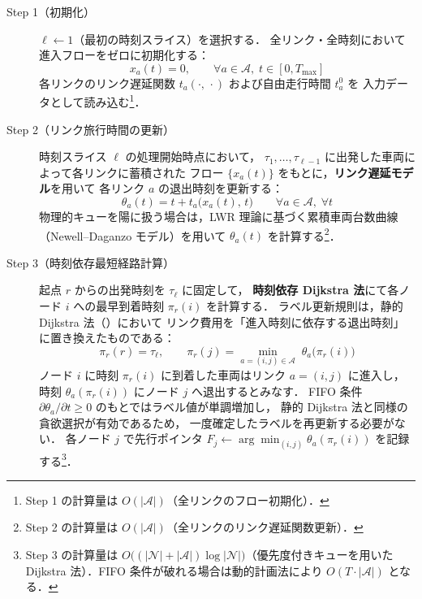 \begin{description}
  \item[\textsf{Step 1}（初期化）]
    $\ell \leftarrow 1$（最初の時刻スライス）を選択する．
    全リンク・全時刻において進入フローをゼロに初期化する：
    \[
      x_a(t) = 0, \qquad \forall a \in \mathcal{A},\; t \in [0, T_{\max}]
    \]
    各リンクのリンク遅延関数 $t_a(\cdot,\,\cdot)$ および自由走行時間 $t_a^0$ を
    入力データとして読み込む\footnote{Step 1 の計算量は $O(|\mathcal{A}|)$（全リンクのフロー初期化）．}．

  \item[\textsf{Step 2}（リンク旅行時間の更新）]
    時刻スライス $\ell$ の処理開始時点において，
    $\tau_1, \ldots, \tau_{\ell-1}$ に出発した車両によって各リンクに蓄積された
    フロー $\{x_a(t)\}$ をもとに，\textbf{リンク遅延モデル}を用いて
    各リンク $a$ の退出時刻を更新する：
    \begin{equation}
      \theta_a(t) = t + t_a\bigl(x_a(t),\, t\bigr) \qquad \forall a \in \mathcal{A},\; \forall t
      \label{eq:link-delay-update}
    \end{equation}
    物理的キューを陽に扱う場合は，LWR 理論に基づく累積車両台数曲線
    （Newell--Daganzo モデル）を用いて $\theta_a(t)$ を計算する\footnote{Step 2 の計算量は $O(|\mathcal{A}|)$（全リンクのリンク遅延関数更新）．}．

  \item[\textsf{Step 3}（時刻依存最短経路計算）]
    起点 $r$ からの出発時刻を $\tau_\ell$ に固定して，
    \textbf{時刻依存 Dijkstra 法}にて各ノード $i$ への最早到着時刻 $\pi_r(i)$ を計算する．
    ラベル更新規則は，静的 Dijkstra 法（）において
    リンク費用を「進入時刻に依存する退出時刻」に置き換えたものである：
    \begin{equation}
      \pi_r(r) = \tau_\ell, \qquad
      \pi_r(j) = \min_{a=(i,j) \in \mathcal{A}}\; \theta_a\!\bigl(\pi_r(i)\bigr)
      \label{eq:time-dep-dijkstra}
    \end{equation}
    ノード $i$ に時刻 $\pi_r(i)$ に到着した車両はリンク $a=(i,j)$ に進入し，
    時刻 $\theta_a(\pi_r(i))$ にノード $j$ へ退出するとみなす．
    FIFO 条件 $\partial\theta_a/\partial t \geq 0$ のもとではラベル値が単調増加し，
    静的 Dijkstra 法と同様の貪欲選択が有効であるため，
    一度確定したラベルを再更新する必要がない．
    各ノード $j$ で先行ポインタ $F_j \leftarrow \arg\min_{(i,j)} \theta_a(\pi_r(i))$ を記録する\footnote{Step 3 の計算量は $O\!\bigl((|\mathcal{N}|+|\mathcal{A}|)\log|\mathcal{N}|\bigr)$（優先度付きキューを用いた Dijkstra 法）．FIFO 条件が破れる場合は動的計画法により $O(T \cdot |\mathcal{A}|)$ となる．}．


\end{description}

